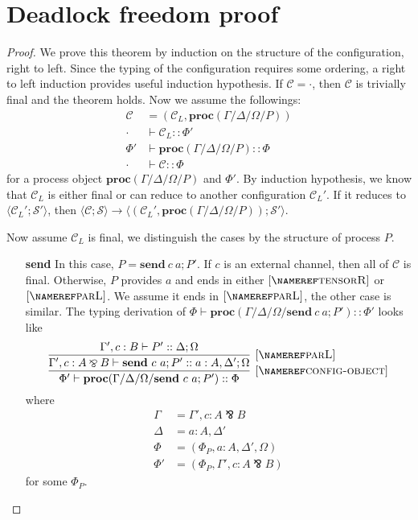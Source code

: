 \documentclass[12pt, openany]{memoir}
\newcommand*{\pare}[0]{\mathbin{\bindnasrepma}}
\newcommand*{\send}[2]{\textbf{send}\ #1\ #2}
\newcommand*{\procObj}[4]{\textbf{proc}(#1/#2/#3/#4)}
\newcommand*{\config}[0]{\mathcal{C}}
\newcommand*{\cancelSet}[0]{\mathcal{S}}
\begin{document}
\section{Deadlock freedom proof}\label{sec::deadlockproof}
\begin{proof}
  We prove this theorem by induction on the structure of the configuration, right to left.
  Since the typing of the configuration requires some ordering, a right to left induction provides useful induction hypothesis.
  If $\config = \cdot$, then $\config$ is trivially final and the theorem holds.
  Now we assume the followings: 
  \begin{align*}
    \config &= (\config_L, \procObj{\Gamma}{\Delta}{\Omega}{P}) \\
    \cdot & \vdash \config_L :: \Phi' \\
    \Phi' & \vdash \procObj{\Gamma}{\Delta}{\Omega}{P} :: \Phi \\
    \cdot & \vdash \config :: \Phi
  \end{align*}
  for a process object $\procObj{\Gamma}{\Delta}{\Omega}{P}$ and $\Phi'$. By induction hypothesis,
  we know that $\config_L$ is either final or can reduce to another configuration $\config_L'$.
  If it reduces to $\langle \config_L'; \cancelSet' \rangle$, then $\langle \config; \cancelSet \rangle \longrightarrow 
  \langle (\config_L', \procObj{\Gamma}{\Delta}{\Omega}{P}); \cancelSet' \rangle$.
  
  Now assume $\config_L$ is final, we distinguish the cases by the structure of process $P$.
  \begin{itemize}
    \item [\textbf{send}] In this case, $P = \send{c}{a}; P'$. 
    If $c$ is an external channel, then all of $\config$ is final.
    Otherwise, $P$ provides $a$ and ends in either $\ruleref{tensorR}$ or $\ruleref{parL}$. 
    We assume it ends in $\ruleref{parL}$, the other case is similar.
    The typing derivation of $\Phi \vdash \procObj{\Gamma}{\Delta}{\Omega}{\send{c}{a}; P'} :: \Phi'$ looks like
    \[
      \infer[\ruleref{config-object}]{\Phi' \vdash \procObj{\Gamma}{\Delta}{\Omega}{\send{c}{a}; P'} :: \Phi}{
        \infer[\ruleref{parL}]{\Gamma', c : A \pare B \vdash \send{c}{a}; P' :: a : A, \Delta'; \Omega}{
          \Gamma', c : B \vdash P' :: \Delta; \Omega
        }
      }
    \] 
    where 
    \begin{align*}
      \Gamma & = \Gamma', c : A \pare B \\
      \Delta & = a : A, \Delta' \\
      \Phi & = (\Phi_P, a : A, \Delta', \Omega) \\
      \Phi' & = (\Phi_P, \Gamma', c : A \pare B)
    \end{align*}
    for some $\Phi_P$.


\end{itemize}
\end{proof}
\end{document}
